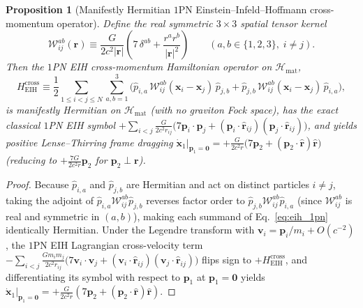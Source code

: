 \documentclass[aps,prd,onecolumn,tightenlines,nofootinbib,notitlepage,11pt,floatfix]{revtex4-2}
\theoremstyle{indentedtheorem}
\newtheorem{proposition}{Proposition}
\begin{document}
\begin{proposition}[Manifestly Hermitian $1$PN Einstein--Infeld--Hoffmann cross-momentum operator]\label{prop:eih_1pn}
Define the real symmetric $3\times 3$ spatial tensor kernel
\begin{equation}
    \mathcal{W}_{ij}^{ab}(\mathbf{r}) \equiv \frac{G}{2c^2|\mathbf{r}|}\!\left(7\,\delta^{ab} + \frac{r^a r^b}{|\mathbf{r}|^2}\right) \qquad (a,b\in\{1,2,3\},\; i\neq j) .
    \label{eq:eih_kernel}
\end{equation}
Then the $1$PN EIH cross-momentum Hamiltonian operator on $\mathcal{H}_\text{mat}$,
\begin{equation}
    H_\text{EIH}^\text{cross} \equiv \frac{1}{2}\sum_{1\le i<j\le N}\sum_{a,b=1}^{3} \Big(\hat{p}_{i,a}\,\mathcal{W}_{ij}^{ab}(\mathbf{x}_i-\mathbf{x}_j)\,\hat{p}_{j,b} + \hat{p}_{j,b}\,\mathcal{W}_{ij}^{ab}(\mathbf{x}_i-\mathbf{x}_j)\,\hat{p}_{i,a}\Big) ,
    \label{eq:eih_1pn}
\end{equation}
is manifestly Hermitian on $\mathcal{H}_\text{mat}$ (with no graviton Fock space), has the exact classical $1$PN EIH symbol $+\sum_{i<j}\frac{G}{2c^2 r_{ij}}\big(7\mathbf{p}_i\cdot\mathbf{p}_j + (\mathbf{p}_i\cdot\hat{\mathbf{r}}_{ij})(\mathbf{p}_j\cdot\hat{\mathbf{r}}_{ij})\big)$, and yields positive Lense--Thirring frame dragging $\dot{\mathbf{x}}_1|_{\mathbf{p}_1=\mathbf{0}} = +\frac{G}{2c^2 r}\big(7\mathbf{p}_2 + (\mathbf{p}_2\cdot\hat{\mathbf{r}})\hat{\mathbf{r}}\big)$ (reducing to $+\frac{7G}{2c^2 r}\mathbf{p}_2$ for $\mathbf{p}_2\perp\mathbf{r}$).
\end{proposition}
\begin{proof}
Because $\hat{p}_{i,a}$ and $\hat{p}_{j,b}$ are Hermitian and act on distinct particles $i\neq j$, taking the adjoint of $\hat{p}_{i,a}\mathcal{W}_{ij}^{ab}\hat{p}_{j,b}$ reverses factor order to $\hat{p}_{j,b}\mathcal{W}_{ij}^{ab}\hat{p}_{i,a}$ (since $\mathcal{W}_{ij}^{ab}$ is real and symmetric in $(a,b)$), making each summand of Eq.~\eqref{eq:eih_1pn} identically Hermitian. Under the Legendre transform with $\mathbf{v}_i=\mathbf{p}_i/m_i+O(c^{-2})$, the $1$PN EIH Lagrangian cross-velocity term $-\sum_{i<j}\frac{G m_i m_j}{2c^2 r_{ij}}\big(7\mathbf{v}_i\cdot\mathbf{v}_j+(\mathbf{v}_i\cdot\hat{\mathbf{r}}_{ij})(\mathbf{v}_j\cdot\hat{\mathbf{r}}_{ij})\big)$ flips sign to $+H_\text{EIH}^\text{cross}$, and differentiating its symbol with respect to $\mathbf{p}_1$ at $\mathbf{p}_1=\mathbf{0}$ yields $\dot{\mathbf{x}}_1|_{\mathbf{p}_1=\mathbf{0}} = +\frac{G}{2c^2 r}(7\mathbf{p}_2+(\mathbf{p}_2\cdot\hat{\mathbf{r}})\hat{\mathbf{r}})$.
\end{proof}
\end{document}
